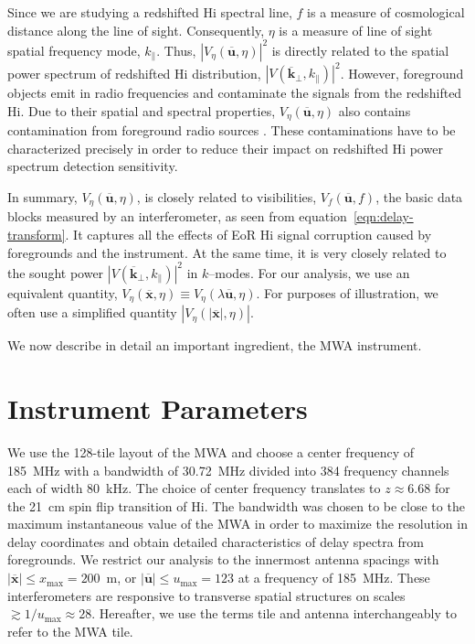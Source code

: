 \documentclass[preprint2,iop,numberedappendix]{emulateapj}
\begin{document}
Since we are studying a redshifted H{\sc i} spectral line, $f$ is a measure of cosmological distance along the line of sight. Consequently, $\eta$ is a measure of line of sight spatial frequency mode, $k_\parallel$. Thus, $|V_\eta(\overline{\mathbf{u}},\eta)|^2$ is directly related to the spatial power spectrum of redshifted H{\sc i} distribution, $|V(\overline{\mathbf{k}}_\perp,k_\parallel)|^2$. However, foreground objects emit in radio frequencies and contaminate the signals from the redshifted H{\sc i}. Due to their spatial and spectral properties, $V_\eta(\overline{\mathbf{u}},\eta)$ also contains contamination from foreground radio sources \citep{thy13,tro12,mor12,bow09}. These contaminations have to be characterized precisely in order to reduce their impact on redshifted H{\sc i} power spectrum detection sensitivity. 

In summary, $V_\eta(\overline{\mathbf{u}},\eta)$, is closely related to visibilities, $V_f(\overline{\mathbf{u}},f)$, the basic data blocks measured by an interferometer, as seen from equation~\ref{eqn:delay-transform}. It captures all the effects of EoR H{\sc i} signal corruption caused by foregrounds and the instrument. At the same time, it is very closely related to the sought power $|V(\overline{\mathbf{k}}_\perp,k_\parallel)|^2$ in $k$--modes. For our analysis, we use an equivalent quantity, $V_\eta(\overline{\mathbf{x}},\eta) \equiv V_\eta(\lambda\overline{\mathbf{u}},\eta)$. For purposes of illustration, we often use a simplified quantity $|V_\eta(|\overline{\mathbf{x}}|,\eta)|$.

We now describe in detail an important ingredient, the MWA instrument.

\section{Instrument Parameters}\label{sec:instrument}

We use the 128-tile layout of the MWA \citep{bea12} and choose a center frequency of 185~MHz with a bandwidth of 30.72~MHz divided into 384 frequency channels each of width 80~kHz. The choice of center frequency translates to $z\approx 6.68$ for the 21~cm spin flip transition of H{\sc i}. The bandwidth was chosen to be close to the maximum instantaneous value of the MWA in order to maximize the resolution in delay coordinates and obtain detailed characteristics of delay spectra from foregrounds. We restrict our analysis to the innermost antenna spacings with $|\overline{\mathbf{x}}| \leq x_\textrm{max} = 200$~m, or $|\overline{\mathbf{u}}| \leq u_\textrm{max} = 123$ at a frequency of 185~MHz. These interferometers are responsive to transverse spatial structures on scales $\gtrsim 1/u_\textrm{max} \approx 28$\arcmin. Hereafter, we use the terms tile and antenna interchangeably to refer to the MWA tile. 
\end{document}
